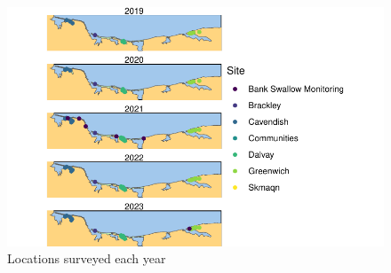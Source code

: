 \documentclass[
  letterpaper,
  DIV=11,
  numbers=noendperiod,
  oneside]{scrartcl}
\begin{document}
\begin{figure}

{\centering \includegraphics{peinp_files/figure-pdf/fig-locs-1.pdf}

}

\caption{\label{fig-locs}Locations surveyed each year}

\end{figure}
\end{document}
